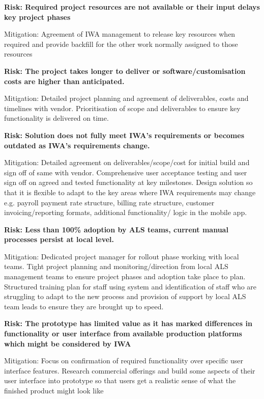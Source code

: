 \documentclass[a4paper,12pt]{article}
\begin{document}
\begin{samepage}
\noindent\makebox[\linewidth]{\rule{\paperwidth}{0.4pt}}
\textbf{Risk: Required project resources are not available or their input delays key project phases}

Mitigation: Agreement of IWA management to release key resources when required and provide backfill for the other work normally assigned to those resources

\noindent\makebox[\linewidth]{\rule{\paperwidth}{0.4pt}}
\textbf{Risk: The project takes longer to deliver or software/customisation costs are higher than anticipated.}

Mitigation: Detailed project planning and agreement of deliverables, costs and timelines with vendor. Prioritisation of scope and deliverables to ensure key functionality is delivered on time. 

\noindent\makebox[\linewidth]{\rule{\paperwidth}{0.4pt}}
\textbf{Risk: Solution does not fully meet IWA's requirements or becomes outdated as IWA's requirements change.}

Mitigation: Detailed agreement on deliverables/scope/cost for initial build and sign off of same with vendor. Comprehensive user acceptance testing and user sign off on agreed and tested functionality at key milestones. Design solution so that it is flexible to adapt to the key areas where IWA requirements may change e.g. payroll payment rate structure, billing rate structure, customer invoicing/reporting formats, additional functionality/ logic in the mobile app.

\noindent\makebox[\linewidth]{\rule{\paperwidth}{0.4pt}}
\textbf{Risk: Less than 100\% adoption by ALS teams, current manual processes persist at local level.}

Mitigation: Dedicated project manager for rollout phase working with local teams. Tight project planning and monitoring/direction from local ALS management teams to ensure project phases and adoption take place to plan. Structured training plan for staff using system and identification of staff who are struggling to adapt to the new process and provision of support by local ALS team leads to ensure they are brought up to speed.

\noindent\makebox[\linewidth]{\rule{\paperwidth}{0.4pt}}
\textbf{Risk: The prototype has limited value as it has marked differences in functionality or user interface from available production platforms which might be considered by IWA}

Mitigation: Focus on confirmation of required functionality over specific user interface features. Research commercial offerings and build some aspects of their user interface into prototype so that users get a realistic sense of what the finished product might look like


\end{samepage}
\end{document}
